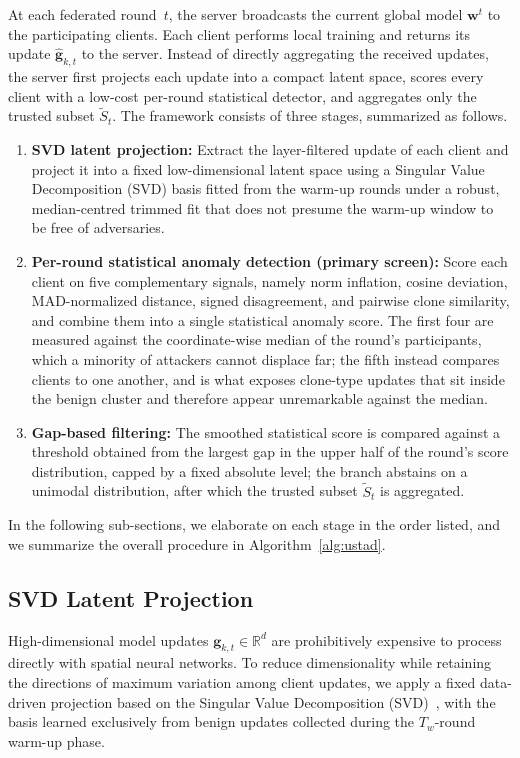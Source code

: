 \documentclass[journal]{IEEEtran}
\begin{document}
At each federated round~$t$, the server broadcasts the current global model $\mathbf{w}^t$ to the participating clients. Each client performs local training and returns its update $\hat{\mathbf{g}}_{k,t}$ to the server. Instead of directly aggregating the received updates, the server first projects each update into a compact latent space, scores every client with a low-cost per-round statistical detector, and aggregates only the trusted subset $\widetilde{S}_t$. The framework consists of three stages, summarized as follows.
\begin{enumerate}
    \item \textbf{SVD latent projection:} Extract the layer-filtered update of each client and project it into a fixed low-dimensional latent space using a Singular Value Decomposition (SVD) basis fitted from the warm-up rounds under a robust, median-centred trimmed fit that does not presume the warm-up window to be free of adversaries.
    \item \textbf{Per-round statistical anomaly detection (primary screen):} Score each client on five complementary signals, namely norm inflation, cosine deviation, MAD-normalized distance, signed disagreement, and pairwise clone similarity, and combine them into a single statistical anomaly score. The first four are measured against the coordinate-wise median of the round's participants, which a minority of attackers cannot displace far; the fifth instead compares clients to one another, and is what exposes clone-type updates that sit inside the benign cluster and therefore appear unremarkable against the median.
    \item \textbf{Gap-based filtering:} The smoothed statistical score is compared against a threshold obtained from the largest gap in the upper half of the round's score distribution, capped by a fixed absolute level; the branch abstains on a unimodal distribution, after which the trusted subset $\widetilde{S}_t$ is aggregated.
\end{enumerate}

In the following sub-sections, we elaborate on each stage in the order listed, and we summarize the overall procedure in Algorithm~\ref{alg:ustad}.

\subsection{SVD Latent Projection}
\label{sec:svd_projection}

High-dimensional model updates $\mathbf{g}_{k,t} \in \mathbb{R}^d$ are prohibitively expensive to process directly with spatial neural networks. To reduce dimensionality while retaining the directions of maximum variation among client updates, we apply a fixed data-driven projection based on the Singular Value Decomposition (SVD)~\cite{zhang2015singular}, with the basis learned exclusively from benign updates collected during the $T_w$-round warm-up phase.
\end{document}
